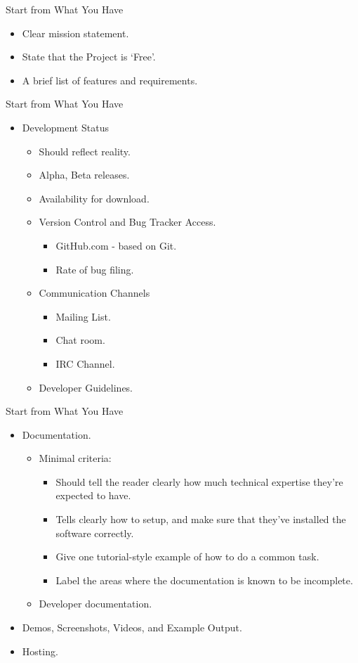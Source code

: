\documentclass{beamer}
\begin{document}
\begin{frame}{Start from What You Have}
\begin{itemize}
	\item Clear mission statement.
	\item State that the Project is `Free'. 
	\item A brief list of features and requirements.
\end{itemize}
\end{frame}

\begin{frame}{Start from What You Have}
\begin{itemize}
	\item Development Status 
	\begin{itemize}
		\item Should reflect reality.
		\item Alpha, Beta releases. 
		\item Availability for download. 
		\item Version Control and Bug Tracker Access. 
		\begin{itemize}
			\item GitHub.com - based on Git. 
			\item Rate of bug filing. 
		\end{itemize}
		\item Communication Channels
		\begin{itemize}
			\item Mailing List. 
			\item Chat room. 
			\item IRC Channel. 
		\end{itemize}
		\item Developer Guidelines. 
	\end{itemize}		
\end{itemize}
\end{frame}

\begin{frame}{Start from What You Have}
\begin{itemize}
	\item Documentation. 
	\begin{itemize}
		\item Minimal criteria: 
		\begin{itemize}
			\item Should tell the reader clearly how much technical expertise they're expected to have. 
			\item Tells clearly how to setup, and make sure that they've installed the software correctly. 
			\item Give one tutorial-style example of how to do a common task. 
			\item Label the areas where the documentation is known to be incomplete. 	
		\end{itemize}
		\item Developer documentation.	
	\end{itemize}
	\item Demos, Screenshots, Videos, and Example Output. 
	\item Hosting.
\end{itemize}
\end{frame}
\end{document}
